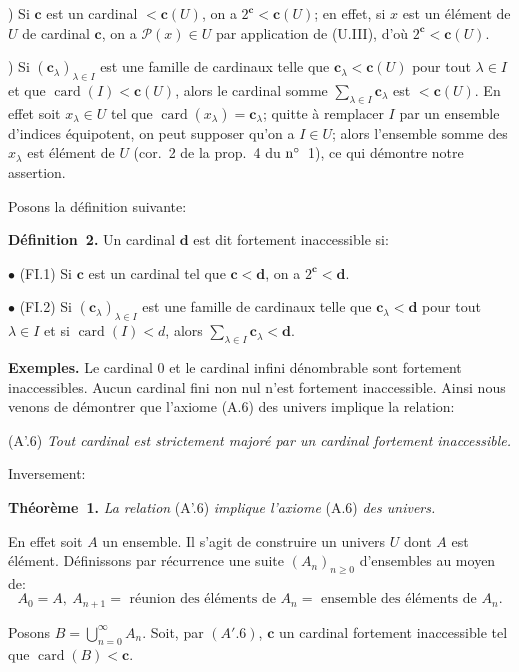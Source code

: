 \documentclass[12pt]{article}
\newcommand{\nn}{\noindent}
\newcommand{\card}{\operatorname{card}}
\begin{document}
\nn1) Si $\mathbf c$ est un cardinal $ < \mathbf c(U)$, on a $2^{\mathbf c} < \mathbf c(U)$; en effet, si $x$ est un élément de $U$ de cardinal $\mathbf c$, on a $\mathcal{P}(x)\in U$ par application de (U.III), d'où $2^{\mathbf c} < \mathbf c(U)$.

\nn2) Si $(\mathbf c_{\lambda})_{\lambda\in I}$ est une famille de cardinaux telle que $\mathbf c_{\lambda} < \mathbf c(U)$ pour tout $\lambda\in I$ et que $\card(I) < \mathbf c(U)$, alors le cardinal somme $\sum_{\lambda \in I}\mathbf c_{\lambda}$ est $ < \mathbf c(U)$. En effet soit $x_{\lambda}\in U$ tel que $\card(x_{\lambda})=\mathbf c_{\lambda}$; quitte à remplacer $I$ par un ensemble d'indices équipotent, on peut supposer qu'on a $I\in U$; alors l'ensemble somme des $x_{\lambda}$ est élément de $U$ (cor.~2 de la prop.~4 du $\rm n^\circ$~1), ce qui démontre notre assertion.

Posons la définition suivante:

\nn\textbf{Définition~2.} Un cardinal $\mathbf d$ est dit fortement inaccessible si:

\nn $\bullet$ (FI.1) Si $\mathbf c$ est un cardinal tel que $\mathbf c < \mathbf d$, on a $2^{\mathbf c} < \mathbf d$.

\nn $\bullet$ (FI.2) Si $(\mathbf c_{\lambda})_{\lambda\in I}$ est une famille de cardinaux telle que $\mathbf c_{\lambda} < \mathbf d$ pour tout $\lambda\in I$ et si $\card(I) < d$, alors $\sum_{\lambda\in I}\mathbf c_{\lambda} < \mathbf d$.

\nn\textbf{Exemples.} Le cardinal 0 et le cardinal infini dénombrable sont fortement inaccessibles. Aucun cardinal fini non nul n'est fortement inaccessible. Ainsi nous venons de démontrer que l'axiome (A.6) des univers implique la relation:

(A'.6) \emph{Tout cardinal est strictement majoré par un cardinal fortement inaccessible.}

Inversement:

\nn\textbf{Théorème~1.} \emph{La relation} (A'.6) \emph{implique l'axiome} (A.6) \emph{des univers.}

En effet soit $A$ un ensemble. Il s'agit de construire un univers $U$ dont $A$ est élément. Définissons par récurrence une suite $(A_n)_{n\geq 0}$ d'ensembles au moyen de:
\begin{equation*}
A_0=A,\ A_{n+1}=\text{ réunion des éléments de $A_n=$ ensemble des éléments de $A_n$.}\tag{2}
\end{equation*}

Posons $B=\bigcup^\infty_{n=0} A_n$. Soit, par $(A'.6)$, $\mathbf c$ un cardinal fortement inaccessible tel que $\card(B) < \mathbf c$.
\end{document}
